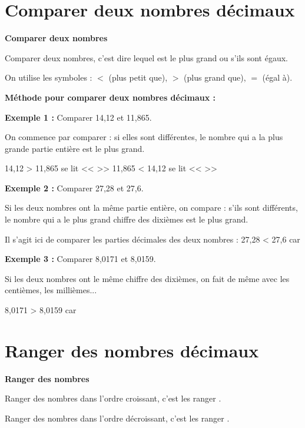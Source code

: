\section{Comparer deux nombres décimaux}

\begin{definitionbox}
	\textbf{Comparer deux nombres}
	
	Comparer deux nombres, c'est dire lequel est le plus grand ou s'ils sont égaux.
	
	On utilise les symboles : $<$ (plus petit que), $>$ (plus grand que), $=$ (égal à).
\end{definitionbox}

\textbf{Méthode pour comparer deux nombres décimaux :}

\begin{examplebox}
	\textbf{Exemple 1 :} Comparer 14,12 et 11,865.
	
	On commence par comparer \trous{4cm} :
	si elles sont différentes, le nombre qui a la plus grande partie entière est le plus grand.
	
	14,12 > 11,865 se lit << \trous{6cm} >>
	11,865 < 14,12 se lit << \trous{6cm} >>
\end{examplebox}

\begin{examplebox}
	\textbf{Exemple 2 :} Comparer 27,28 et 27,6.
	
	Si les deux nombres ont la même partie entière, on compare \trous{4cm} : s'ils sont différents, le nombre qui a le plus grand chiffre des dixièmes est le plus grand.
	
	Il s'agit ici de comparer les parties décimales des deux nombres :
	27,28 < 27,6 car \trous{6cm}
\end{examplebox}

\begin{examplebox}
	\textbf{Exemple 3 :} Comparer 8,0171 et 8,0159.
	
	Si les deux nombres ont le même chiffre des dixièmes, on fait de même avec les centièmes, les millièmes...
	
	8,0171 > 8,0159 car \trous{6cm}
\end{examplebox}

\section{Ranger des nombres décimaux}

\begin{definitionbox}
	\textbf{Ranger des nombres}
	
	Ranger des nombres dans l'ordre croissant, c'est les ranger \trous{4cm}.
	
	Ranger des nombres dans l'ordre décroissant, c'est les ranger \trous{4cm}.
\end{definitionbox}

